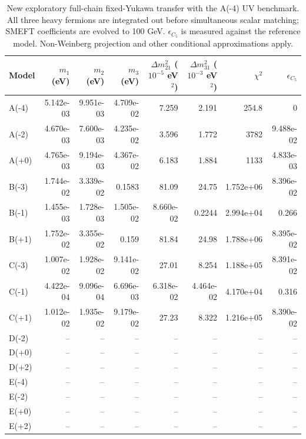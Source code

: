 \begin{table}[htbp]
\centering
\small
\setlength{\tabcolsep}{3.4pt}
\begin{tabular}{lrrrrrrr}
\hline
Model & $m_1$ (eV) & $m_2$ (eV) & $m_3$ (eV) & $\Delta m^2_{21}$ ($10^{-5}$ eV$^2$) & $\Delta m^2_{31}$ ($10^{-3}$ eV$^2$) & $\chi^2$ & $\epsilon_{C_5}$ \\
\hline
A(-4) & 5.142e-03 & 9.951e-03 & 4.709e-02 & 7.259 & 2.191 & 254.8 & 0 \\
A(-2) & 4.670e-03 & 7.600e-03 & 4.235e-02 & 3.596 & 1.772 & 3782 & 9.488e-02 \\
A(+0) & 4.765e-03 & 9.194e-03 & 4.367e-02 & 6.183 & 1.884 & 1133 & 4.833e-03 \\
B(-3) & 1.744e-02 & 3.339e-02 & 0.1583 & 81.09 & 24.75 & 1.752e+06 & 8.396e-02 \\
B(-1) & 1.455e-03 & 1.728e-03 & 1.505e-02 & 8.660e-02 & 0.2244 & 2.994e+04 & 0.266 \\
B(+1) & 1.752e-02 & 3.355e-02 & 0.159 & 81.84 & 24.98 & 1.788e+06 & 8.395e-02 \\
C(-3) & 1.007e-02 & 1.928e-02 & 9.141e-02 & 27.01 & 8.254 & 1.188e+05 & 8.391e-02 \\
C(-1) & 4.422e-04 & 9.096e-04 & 6.696e-03 & 6.318e-02 & 4.464e-02 & 4.170e+04 & 0.316 \\
C(+1) & 1.012e-02 & 1.935e-02 & 9.179e-02 & 27.23 & 8.322 & 1.216e+05 & 8.390e-02 \\
D(-2) & -- & -- & -- & -- & -- & -- & -- \\
D(+0) & -- & -- & -- & -- & -- & -- & -- \\
D(+2) & -- & -- & -- & -- & -- & -- & -- \\
E(-4) & -- & -- & -- & -- & -- & -- & -- \\
E(-2) & -- & -- & -- & -- & -- & -- & -- \\
E(+0) & -- & -- & -- & -- & -- & -- & -- \\
E(+2) & -- & -- & -- & -- & -- & -- & -- \\
\hline
\end{tabular}
\caption{New exploratory full-chain fixed-Yukawa transfer with the A(-4) UV benchmark. All three heavy fermions are integrated out before simultaneous scalar matching; SMEFT coefficients are evolved to 100 GeV. $\epsilon_{C_5}$ is measured against the reference model. Non-Weinberg projection and other conditional approximations apply.}
\label{tab:generalised_b2}
\end{table}
